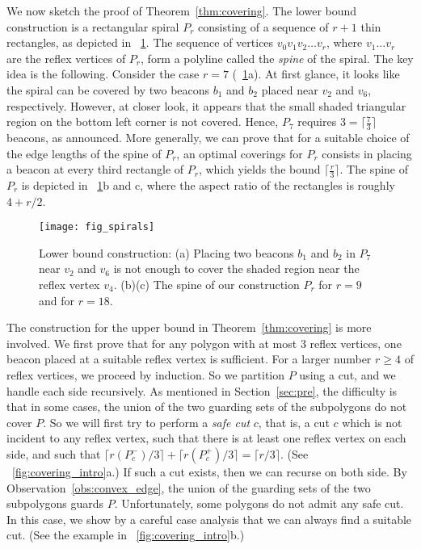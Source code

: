 \documentclass[11pt]{article}
\theoremstyle{definition}
\let\geq\geqslant
\begin{document}
We now sketch the proof of Theorem~\ref{thm:covering}. The lower bound construction is 
a rectangular spiral $P_r$ consisting of a sequence of $r+1$ thin rectangles, as depicted in 
\figurename~\ref{fig:spirals}. The sequence of vertices $v_0v_1v_2 \dots v_r$, where $v_1\dots v_r$
are the reflex vertices of $P_r$,  form
a polyline called the {\it spine} of the spiral. The key idea is the following. Consider
the case $r=7$ (\figurename~\ref{fig:spirals}a). At first glance, it looks like the spiral
can be covered by two beacons $b_1$ and $b_2$ placed near $v_2$ and $v_6$, respectively.
However, at closer look, it appears that the small shaded triangular region on the bottom left 
corner is not covered. Hence, $P_7$ requires $3=\lceil \frac 7 3 \rceil$ beacons, as announced.
More generally, we can prove that  for a suitable choice of the edge lengths of the
spine of $P_r$, an optimal coverings for $P_r$ consists in placing a
beacon at every third rectangle of $P_r$, which yields the bound $\lceil \frac r 3 \rceil$.
The spine of $P_r$ is depicted in \figurename~\ref{fig:spirals}b and c, where the aspect
ratio of the rectangles is roughly $4+r/2$.


\begin{figure}[tb]
\centering
\texttt{[image: fig\_spirals]}
\caption{Lower bound construction:
(a) Placing two beacons $b_1$ and $b_2$ in $P_7$ near $v_2$ and $v_6$
 is not enough to cover the shaded region near the reflex vertex $v_4$.
 (b)(c) The spine of our construction $P_r$ for $r=9$ and for $r=18$. }
\label{fig:spirals}
\end{figure}

The construction for the upper bound in Theorem~\ref{thm:covering} is more involved. 
We first prove that for any polygon with at most 3 reflex vertices, one beacon placed
at a suitable reflex vertex is sufficient. 
For a larger number $r \geq 4$ of reflex vertices, we proceed by induction.
So we partition $P$ using a cut, and we handle each side recursively.
As mentioned in Section~\ref{sec:pre}, the difficulty is that in some cases, the
union of the two guarding sets of the subpolygons do not cover $P$.
So we will first try to perform a {\it safe cut} $c$, that is, a cut $c$ which 
is not incident to any reflex vertex,  such that there is at least one reflex
vertex on each side, and such that 
$\lceil r(P_c^-)/3 \rceil + \lceil r(P_c^+)/3 \rceil =\lceil r/3 \rceil$.
(See \figurename~\ref{fig:covering_intro}a.)
If such a cut exists, then we can recurse on both side. By Observation~\ref{obs:convex_edge},
the union of the guarding sets of the two subpolygons guards $P$.
Unfortunately, some polygons do not admit any safe cut. In this case, we show
by a careful case analysis that we can always find a suitable cut. 
(See the example in \figurename~\ref{fig:covering_intro}b.)
\end{document}
